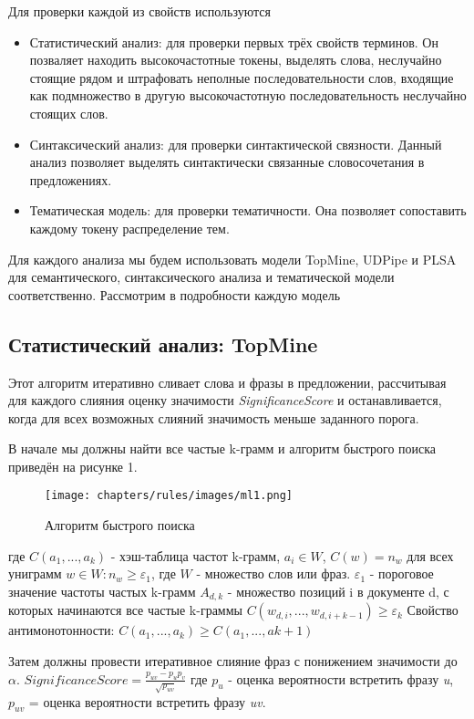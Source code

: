 Для проверки каждой из свойств используются 

\begin{itemize}
	\item Статистический анализ: для проверки первых трёх свойств терминов. Он позваляет находить высокочастотные токены, выделять слова, неслучайно стоящие рядом и штрафовать неполные последовательности слов, входящие как подмножество в другую высокочастотную последовательность неслучайно стоящих слов.
	\item Синтаксический анализ: для проверки синтактической связности. Данный анализ позволяет выделять синтактически связанные словосочетания в предложениях.
	\item Тематическая модель: для проверки тематичности. Она позволяет сопоставить каждому токену распределение тем.
\end{itemize}

Для каждого анализа мы будем использовать модели TopMine, UDPipe и PLSA для семантического, синтаксического анализа и тематической модели соответственно. Рассмотрим в подробности каждую модель

\subsection*{Статистический анализ: TopMine}

Этот алгоритм итеративно сливает слова и фразы в предложении, рассчитывая для каждого слияния оценку значимости \textit{SignificanceScore} и останавливается, когда для всех возможных слияний значимость меньше заданного порога. 

В начале мы должны найти все частые k-грамм и алгоритм быстрого поиска приведён на рисунке 1.
\begin{figure}
    \texttt{[image: chapters/rules/images/ml1.png]}
    \caption{Алгоритм быстрого поиска}
\end{figure}
где $C(a_{1},...,a_{k})$ - хэш-таблица частот k-грамм, $a_{i} \in W$, $C(w) = n_{w}$ для всех униграмм $w \in W: n_{w} \geq \varepsilon_{1}$, где $W$ - множество слов или фраз.
$\varepsilon_{1}$ - пороговое значение частоты частых k-грамм
$A_{d,k}$ - множество позиций i в документе d, с которых начинаются все частые k-граммы
$C(w_{d,i},...,w_{d,i+k-1}) \geq \varepsilon_{k}$
Свойство антимонотонности: $C(a_{1},...,a_{k}) \geq C(a_{1},...,a{k+1})$

Затем должны провести итеративное слияние фраз с понижением значимости до $\alpha$.
$SignificanceScore = \frac{p_{uv}-p_{u}p_{v}}{\sqrt{p_{uv}}}$
где $p_{u}$ - оценка вероятности встретить фразу \textit{u}, $p_{uv}$ = оценка вероятности встретить фразу \textit{uv}.

